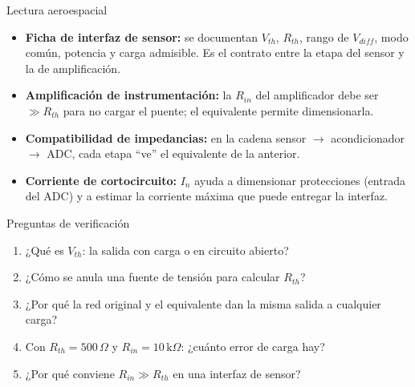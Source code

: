 \documentclass[aspectratio=169]{beamer}
\begin{document}
\begin{frame}{Lectura aeroespacial}
  \begin{itemize}
    \item \textbf{Ficha de interfaz de sensor:} se documentan $V_{th}$, $R_{th}$, rango de $V_{diff}$,
      modo común, potencia y carga admisible. Es el contrato entre la etapa del sensor y la de amplificación.
    \item \textbf{Amplificación de instrumentación:} la $R_{in}$ del amplificador debe ser $\gg R_{th}$
      para no cargar el puente; el equivalente permite dimensionarla.
    \item \textbf{Compatibilidad de impedancias:} en la cadena sensor $\rightarrow$ acondicionador
      $\rightarrow$ ADC, cada etapa ``ve'' el equivalente de la anterior.
    \item \textbf{Corriente de cortocircuito:} $I_n$ ayuda a dimensionar protecciones (entrada del ADC)
      y a estimar la corriente máxima que puede entregar la interfaz.
  \end{itemize}
\end{frame}

\begin{frame}{Preguntas de verificación}
  \begin{enumerate}
    \item ¿Qué es $V_{th}$: la salida con carga o en circuito abierto?
    \item ¿Cómo se anula una fuente de tensión para calcular $R_{th}$?
    \item ¿Por qué la red original y el equivalente dan la misma salida a cualquier carga?
    \item Con $R_{th} = 500\,\Omega$ y $R_{in} = 10\,\text{k}\Omega$: ¿cuánto error de carga hay?
    \item ¿Por qué conviene $R_{in} \gg R_{th}$ en una interfaz de sensor?
  \end{enumerate}
\end{frame}
\end{document}
